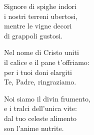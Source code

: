 

\spazio

\strofa Signore di spighe indori\\
i nostri terreni ubertosi,\\
mentre le vigne decori\\
di grappoli gustosi.

\spazio


\spazio

\strofa Nel nome di Cristo uniti\\
il calice e il pane t'offriamo:\\
per i tuoi doni elargiti\\
Te, Padre, ringraziamo.

\spazio


\spazio

\strofa Noi siamo il divin frumento,\\
e i tralci dell'unica vite:\\
dal tuo celeste alimento\\
son l'anime nutrite.

\spazio

